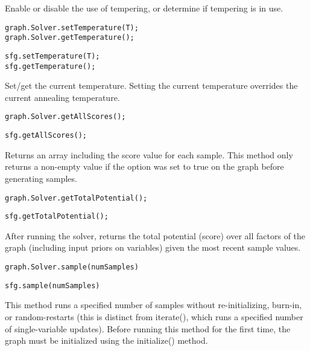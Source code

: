 Enable or disable the use of tempering, or determine if tempering is in use.

\ifmatlab
\begin{lstlisting}
graph.Solver.setTemperature(T);
graph.Solver.getTemperature();
\end{lstlisting}
\fi

\ifjava
\begin{lstlisting}
sfg.setTemperature(T);
sfg.getTemperature();
\end{lstlisting}
\fi

Set/get the current temperature. Setting the current temperature overrides the current annealing temperature.

\ifmatlab
\begin{lstlisting}
graph.Solver.getAllScores();
\end{lstlisting}
\fi

\ifjava
\begin{lstlisting}
sfg.getAllScores();
\end{lstlisting}
\fi

Returns an array including the score value for each sample. This method only returns a non-empty value if the  option was set to true on the graph before generating samples.

\ifmatlab
\begin{lstlisting}
graph.Solver.getTotalPotential();
\end{lstlisting}
\fi

\ifjava
\begin{lstlisting}
sfg.getTotalPotential();
\end{lstlisting}
\fi

After running the solver, returns the total potential (score) over all factors of the graph (including input priors on variables) given the most recent sample values.

\ifmatlab
\begin{lstlisting}
graph.Solver.sample(numSamples)
\end{lstlisting}
\fi

\ifjava
\begin{lstlisting}
sfg.sample(numSamples)
\end{lstlisting}
\fi

This method runs a specified number of samples without re-initializing, burn-in, or random-restarts (this is distinct from iterate(), which runs a specified number of single-variable updates).  Before running this method for the first time, the graph must be initialized using the initialize() method.


